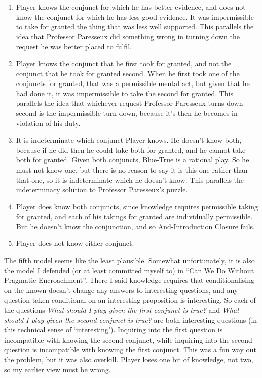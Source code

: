 \documentclass[
  10pt,
  letterpaper,
  twoside]{scrbook}
\providecommand{\tightlist}{%
  \setlength{\itemsep}{0pt}\setlength{\parskip}{0pt}}\usepackage{longtable,booktabs,array}
\begin{document}
\begin{enumerate}
\def\labelenumi{\arabic{enumi}.}
\tightlist
\item
  Player knows the conjunct for which he has better evidence, and does
  not know the conjunct for which he has less good evidence. It was
  impermissible to take for granted the thing that was less well
  supported. This parallels the idea that Professor Paresseux did
  something wrong in turning down the request he was better placed to
  fulfil.
\item
  Player knows the conjunct that he first took for granted, and not the
  conjunct that he took for granted second. When he first took one of
  the conjuncts for granted, that was a permissible mental act, but
  given that he had done it, it was impermissible to take the second for
  granted. This parallels the idea that whichever request Professor
  Paresseux turns down second is the impermissible turn-down, because
  it's then he becomes in violation of his duty.
\item
  It is indeterminate which conjunct Player knows. He doesn't know both,
  because if he did then he could take both for granted, and he cannot
  take both for granted. Given both conjuncts, Blue-True is a rational
  play. So he must not know one, but there is no reason to say it is
  this one rather than that one, so it is indeterminate which he doesn't
  know. This parallels the indeterminacy solution to Professor
  Paresseux's puzzle.
\item
  Player does know both conjuncts, since knowledge requires permissible
  taking for granted, and each of his takings for granted are
  individually permissible. But he doesn't know the conjunction, and so
  And-Introduction Closure fails.
\item
  Player does not know either conjunct.
\end{enumerate}

The fifth model seems like the least plausible. Somewhat unfortunately,
it is also the model I defended (or at least committed myself to) in
``Can We Do Without Pragmatic Encroachment''. There I said knowledge
requires that conditionalising on the known doesn't change any answers
to interesting questions, and any question taken conditional on an
interesting proposition is interesting. So each of the questions
\emph{What should I play given the first conjunct is true?} and
\emph{What should I play given the second conjunct is true?} are both
interesting questions (in this technical sense of `interesting').
Inquiring into the first question is incompatible with knowing the
second conjunct, while inquiring into the second question is
incompatible with knowing the first conjunct. This was a fun way out the
problem, but it was also overkill. Player loses one bit of knowledge,
not two, so my earlier view must be wrong.
\end{document}
